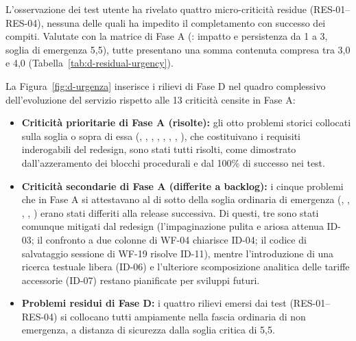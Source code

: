 L'osservazione dei test utente ha rivelato quattro micro-criticità residue (RES-01--RES-04), nessuna delle quali ha impedito il completamento con successo dei compiti. Valutate con la matrice di Fase A (: impatto e persistenza da 1 a 3, soglia di emergenza 5,5), tutte presentano una somma contenuta compresa tra 3,0 e 4,0 (Tabella~\ref{tab:d-residual-urgency}).

La Figura~\ref{fig:d-urgenza} inserisce i rilievi di Fase D nel quadro complessivo dell'evoluzione del servizio rispetto alle 13 criticità censite in Fase A:
\begin{itemize}
\item \textbf{Criticità prioritarie di Fase A (risolte):} gli otto problemi storici collocati sulla soglia o sopra di essa (, , , , , , , ), che costituivano i requisiti inderogabili del redesign, sono stati tutti risolti, come dimostrato dall'azzeramento dei blocchi procedurali e dal 100\% di successo nei test.
\item \textbf{Criticità secondarie di Fase A (differite a backlog):} i cinque problemi che in Fase A si attestavano al di sotto della soglia ordinaria di emergenza (, , , , ) erano stati differiti alla release successiva. Di questi, tre sono stati comunque mitigati dal redesign (l'impaginazione pulita e ariosa attenua ID-03; il confronto a due colonne di WF-04 chiarisce ID-04; il codice di salvataggio sessione di WF-19 risolve ID-11), mentre l'introduzione di una ricerca testuale libera (ID-06) e l'ulteriore scomposizione analitica delle tariffe accessorie (ID-07) restano pianificate per sviluppi futuri.
\item \textbf{Problemi residui di Fase D:} i quattro rilievi emersi dai test (RES-01--RES-04) si collocano tutti ampiamente nella fascia ordinaria di non emergenza, a distanza di sicurezza dalla soglia critica di 5,5.
\end{itemize}


